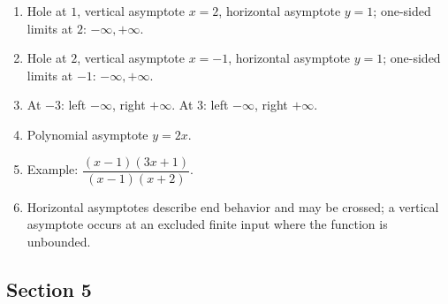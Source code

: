 \documentclass[11pt,openany]{book}
\theoremstyle{bgplain}
\begin{document}
\begin{enumerate}[label=\textbf{4.\arabic*}]
  \item Hole at \(1\), vertical asymptote \(x=2\), horizontal asymptote \(y=1\); one-sided limits at \(2\): \(-\infty,+\infty\).
  \item Hole at \(2\), vertical asymptote \(x=-1\), horizontal asymptote \(y=1\); one-sided limits at \(-1\): \(-\infty,+\infty\).
  \item At \(-3\): left \(-\infty\), right \(+\infty\). At \(3\): left \(-\infty\), right \(+\infty\).
  \item Polynomial asymptote \(y=2x\).
  \item Example: \(\dfrac{(x-1)(3x+1)}{(x-1)(x+2)}\).
  \item Horizontal asymptotes describe end behavior and may be crossed; a vertical asymptote occurs at an excluded finite input where the function is unbounded.
\end{enumerate}

\subsection*{Section 5}
\end{document}
